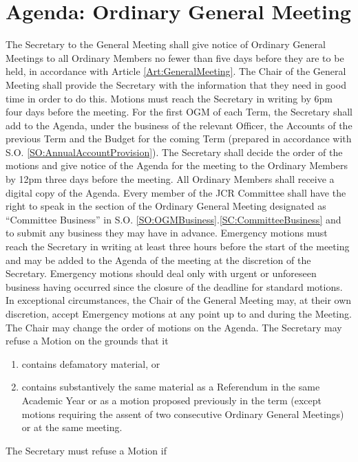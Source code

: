\section{Agenda: Ordinary General Meeting}
\npara The Secretary to the General Meeting shall give notice of Ordinary General Meetings to all Ordinary Members no fewer than five days before they are to be held, in accordance with Article \ref{Art:GeneralMeeting}.  The Chair of the General Meeting shall provide the Secretary with the information that they need in good time in order to do this.
\npara Motions must reach the Secretary in writing by 6pm four days before the meeting.
\npara For the first OGM of each Term, the Secretary shall add to the Agenda, under the business of the relevant Officer, the Accounts of the previous Term and the Budget for the coming Term (prepared in accordance with S.O. \ref{SO:AnnualAccountProvision}).
\npara The Secretary shall decide the order of the motions and give notice of the Agenda for the meeting to the Ordinary Members by 12pm three days before the meeting.
\npara All Ordinary Members shall receive a digital copy of the Agenda.
\npara Every member of the JCR Committee shall have the right to speak in the section of the Ordinary General Meeting designated as ``Committee Business'' in S.O. \ref{SO:OGMBusiness}.\ref{SC:CommitteeBusiness} and to submit any business they may have in advance.
\npara Emergency motions must reach the Secretary in writing at least three hours before the start of the meeting and may be added to the Agenda of the meeting at the discretion of the Secretary. Emergency motions should deal only with urgent or unforeseen business having occurred since the closure of the deadline for standard motions.
\npara In exceptional circumstances, the Chair of the General Meeting may, at their own discretion, accept Emergency motions at any point up to and during the Meeting.
\npara The Chair may change the order of motions on the Agenda.
\npara\label{gm:optional_refusal} The Secretary may refuse a Motion on the grounds that it 
\begin{enumerate}
    \item contains defamatory material, or
    \item contains substantively the same material as a Referendum in the same Academic Year or as a motion proposed previously in the term (except motions requiring the assent of two consecutive Ordinary General Meetings) or at the same meeting.
\end{enumerate}
\npara\label{gm:obligatory_refusal} The Secretary must refuse a Motion if 
